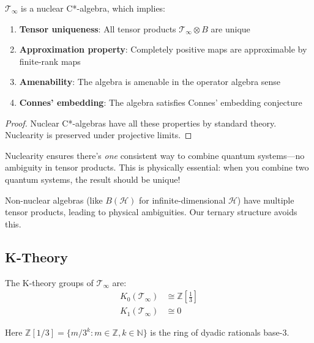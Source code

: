\begin{defn}
\begin{lemma}\label{lem:nuclear-structure}
$\mathcal{T}_\infty$ is a nuclear C*-algebra, which implies:
\begin{enumerate}
\item \textbf{Tensor uniqueness}: All tensor products $\mathcal{T}_\infty \otimes B$ are unique
\item \textbf{Approximation property}: Completely positive maps are approximable by finite-rank maps
\item \textbf{Amenability}: The algebra is amenable in the operator algebra sense
\item \textbf{Connes' embedding}: The algebra satisfies Connes' embedding conjecture
\end{enumerate}
\end{lemma}

\begin{proof}
Nuclear C*-algebras have all these properties by standard theory\cite{brown_c_2008, connes_noncommutative_1994}. Nuclearity is preserved under projective limits.
\end{proof}

\begin{keyidea}
Nuclearity ensures there's \textit{one} consistent way to combine quantum systems—no ambiguity in tensor products. This is physically essential: when you combine two quantum systems, the result should be unique!

Non-nuclear algebras (like $B(\mathcal{H})$ for infinite-dimensional $\mathcal{H}$) have multiple tensor products, leading to physical ambiguities. Our ternary structure avoids this.
\end{keyidea}

\subsection{K-Theory}

\begin{thm}\label{thm:k-theory}
The K-theory groups of $\mathcal{T}_\infty$ are:
\begin{align}
K_0(\mathcal{T}_\infty) &\cong \mathbb{Z}\left[\frac{1}{3}\right] \label{eq:k0-timeless}\\
K_1(\mathcal{T}_\infty) &\cong 0 \label{eq:k1-timeless}
\end{align}

Here $\mathbb{Z}[1/3] = \{m/3^k : m \in \mathbb{Z}, k \in \mathbb{N}\}$ is the ring of dyadic rationals base-3.
\end{thm}


\end{defn}
